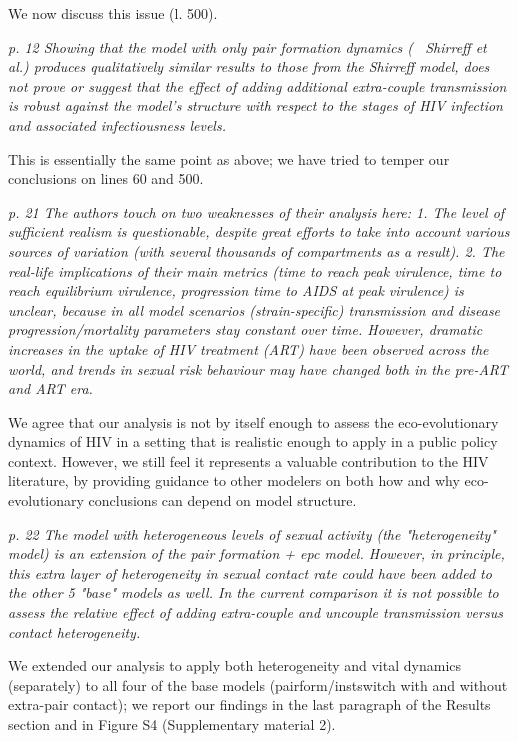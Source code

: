 \documentclass[10pt]{letter}
\newcommand{\revcomment}[1]{\emph{#1}}
\newcommand{\response}[1]{#1}
\begin{document}
\begin{letter}{
}
\response{We now discuss this issue (l. 500).}

\revcomment{
p. 12 Showing that the model with only pair formation dynamics (~
Shirreff et al.) produces qualitatively similar results to those from
the Shirreff model, does not prove or suggest that the effect of
adding additional extra-couple transmission is robust against the
model's structure with respect to the stages of HIV infection and
associated infectiousness levels.
}

\response{This is essentially the same point as above; we have tried to 
temper our conclusions on lines 60 and 500.}

\revcomment{
p. 21 The authors touch on two weaknesses of their analysis here: 1. The level of sufficient realism is questionable, despite great efforts to take into account various sources of variation (with several thousands of compartments as a result).
2. The real-life implications of their main metrics (time to reach
peak virulence, time to reach equilibrium virulence, progression time
to AIDS at peak virulence) is unclear, because in all model scenarios
(strain-specific) transmission and disease progression/mortality
parameters stay constant over time. However, dramatic increases in the
uptake of HIV treatment (ART) have been observed across the world, and
trends in sexual risk behaviour may have changed both in the pre-ART
and ART era.
}

\response{
We agree that our analysis is not by itself enough to assess 
the eco-evolutionary dynamics of HIV in a setting that is realistic
enough to apply in a public policy context. However, we still feel
it represents a valuable contribution to the HIV literature, by
providing guidance to other modelers on both how and why 
eco-evolutionary conclusions can depend on model structure.
}

\revcomment{
p. 22  The model with heterogeneous levels of sexual activity (the
"heterogeneity" model) is an extension of the pair formation + epc
model. However, in principle, this extra layer of heterogeneity in
sexual contact rate could have been added to the other 5 "base" models
as well. In the current comparison it is not possible to assess the
relative effect of adding extra-couple and uncouple transmission
versus contact heterogeneity.
}

\response{
We extended our analysis to apply both heterogeneity and vital dynamics
(separately) to all four of the base models (pairform/instswitch with
and without extra-pair contact); we report our findings in the
last paragraph of the Results section and in Figure S4 (Supplementary material 2).
}


\end{letter}
\end{document}
